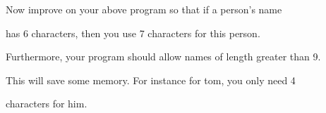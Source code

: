 Now improve on your above program so that if a person's name

has 6 characters, then you use 7 characters for this person.

Furthermore, your program should allow names of length greater than 9.

This will save some memory. For instance for tom, you only need 4

characters for him.

